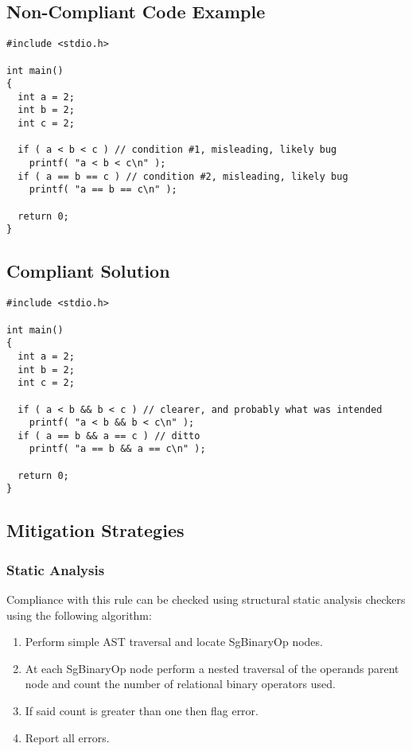 \subsection{Non-Compliant Code Example}

\begin{verbatim}
#include <stdio.h>

int main()
{
  int a = 2;
  int b = 2;
  int c = 2;

  if ( a < b < c ) // condition #1, misleading, likely bug
    printf( "a < b < c\n" );
  if ( a == b == c ) // condition #2, misleading, likely bug
    printf( "a == b == c\n" );

  return 0;
}
\end{verbatim}

\subsection{Compliant Solution}

\begin{verbatim}
#include <stdio.h>

int main()
{
  int a = 2;
  int b = 2;
  int c = 2;

  if ( a < b && b < c ) // clearer, and probably what was intended
    printf( "a < b && b < c\n" );
  if ( a == b && a == c ) // ditto
    printf( "a == b && a == c\n" );

  return 0;
}
\end{verbatim}

\subsection{Mitigation Strategies}
\subsubsection{Static Analysis} 

Compliance with this rule can be checked using structural static analysis checkers using the following algorithm:

\begin{enumerate}
\item Perform simple AST traversal and locate SgBinaryOp nodes.
\item At each SgBinaryOp node perform a nested traversal of the operands parent node and count the number of relational binary operators used.
\item If said count is greater than one then flag error.
\item Report all errors. 
\end{enumerate}

